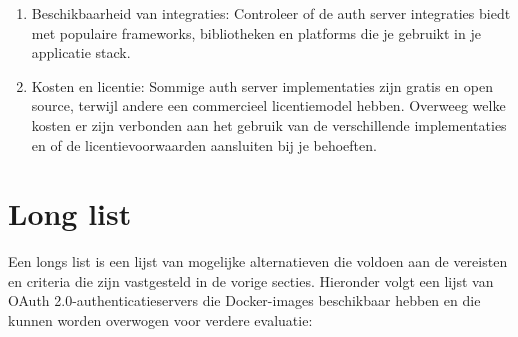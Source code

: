 \begin{enumerate}
  \item Beschikbaarheid van integraties: Controleer of de \gls{auth} server integraties biedt met populaire frameworks, bibliotheken en platforms die je gebruikt in je applicatie stack.
  
  \item Kosten en licentie: Sommige \gls{auth} server implementaties zijn gratis en open source, terwijl andere een commercieel licentiemodel hebben. Overweeg welke kosten er zijn verbonden aan het gebruik van de verschillende implementaties en of de licentievoorwaarden aansluiten bij je behoeften.
\end{enumerate}


\section{Long list}%
\label{sec:long-list}
Een longs list is een lijst van mogelijke alternatieven die voldoen aan de vereisten en criteria die zijn vastgesteld in de vorige secties. Hieronder volgt een lijst van OAuth 2.0-authenticatieservers die Docker-images beschikbaar hebben en die kunnen worden overwogen voor verdere evaluatie:
